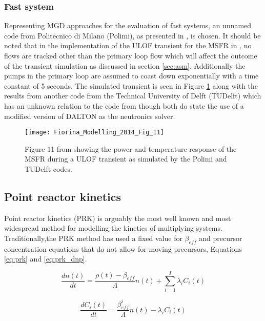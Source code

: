 \documentclass[review]{elsarticle}
\begin{document}
\subsubsection{Fast system} \label{sssec:mgd_fs}
Representing MGD approaches for the evaluation of fast systems, an unnamed code
from Politecnico di Milano (Polimi), as presented in \cite{fiorina_modelling_2014}, is
chosen. It should be noted that in the implementation of the ULOF transient for
the MSFR in \cite{fiorina_modelling_2014}, no flows are tracked other than the primary
loop flow which will affect the outcome of the transient simulation as discussed in
section \ref{sec:asm}. Additionally the pumps in the primary loop are assumed to
coast down exponentially with a time constant of 5 seconds. The simulated transient is
seen in Figure \ref{fig:fiorina_msfr_ulof} along with the results from another
code from the Technical University of Delft (TUDelft) which has an unknown relation to
the code from \cite{kophazi_development_2009} though both do state the use of a
modified version of DALTON as the neutronics solver. 

\begin{figure}[H]
   \centering
   \texttt{[image: Fiorina\_Modelling\_2014\_Fig\_11]}
   \caption{Figure 11 from \cite{fiorina_modelling_2014} showing the power and temperature
   response of the MSFR during a ULOF transient as simulated by the Polimi and TUDelft codes.} 
   \label{fig:fiorina_msfr_ulof}
\end{figure}

\subsection{Point reactor kinetics} \label{ssec:prk}
Point reactor kinetics (PRK) is arguably the most well known and most widespread
method for modelling the kinetics of multiplying systems. Traditionally,the PRK
method has used a fixed value for $\beta_{eff}$ and precursor concentration
equations
that do not allow for moving precursors, Equations \ref{eq:prk} and
\ref{eq:prk_dnp}.

\begin{equation}
    \label{eq:prk}
    \frac{dn(t)}{dt} = \frac{\rho(t) - \beta_{eff}}{\Lambda} n(t) +
     \sum_{i = 1}^{I} \lambda_{i} C_{i}(t)
\end{equation}

\begin{equation}
    \label{eq:prk_dnp}
    \frac{dC_{i}(t)}{dt} = \frac{\beta_{eff}^{i}}{\Lambda} n(t) -
        \lambda_{i} C_{i}(t)
\end{equation}
\end{document}
